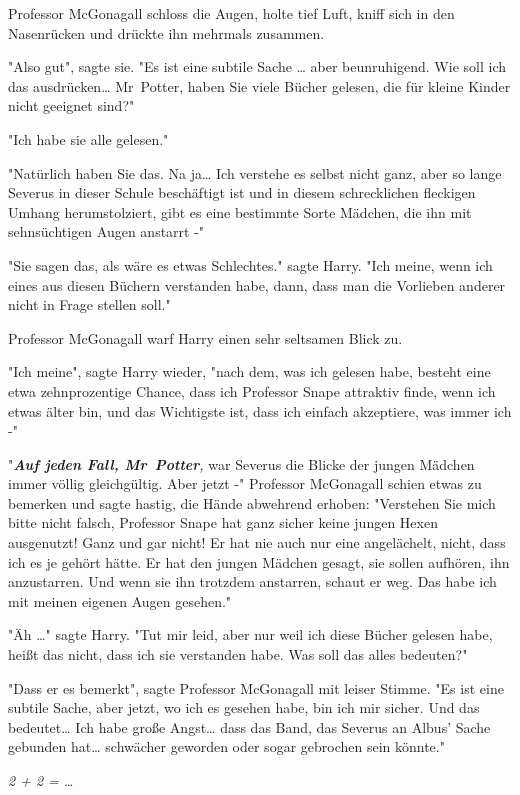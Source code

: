 {Professor McGonagall schloss die Augen, holte tief Luft, kniff sich in den Nasenrücken und drückte ihn mehrmals zusammen.

"Also gut", sagte sie. "Es ist eine subtile Sache … aber beunruhigend. Wie soll ich das ausdrücken… Mr~Potter, haben Sie viele Bücher gelesen, die für kleine Kinder nicht geeignet sind?"

"Ich habe sie alle gelesen."

"Natürlich haben Sie das. Na ja… Ich verstehe es selbst nicht ganz, aber so lange Severus in dieser Schule beschäftigt ist und in diesem schrecklichen fleckigen Umhang herumstolziert, gibt es eine bestimmte Sorte Mädchen, die ihn mit sehnsüchtigen Augen anstarrt -"

"Sie sagen das, als wäre es etwas Schlechtes." sagte Harry. "Ich meine, wenn ich eines aus diesen Büchern verstanden habe, dann, dass man die Vorlieben anderer nicht in Frage stellen soll."

Professor McGonagall warf Harry einen sehr seltsamen Blick zu.

"Ich meine", sagte Harry wieder, "nach dem, was ich gelesen habe, besteht eine etwa zehnprozentige Chance, dass ich Professor Snape attraktiv finde, wenn ich etwas älter bin, und das Wichtigste ist, dass ich einfach akzeptiere, was immer ich -"

"\textbf{\emph{Auf jeden Fall, Mr~Potter}}\emph{,} war Severus die Blicke der jungen Mädchen immer völlig gleichgültig. Aber jetzt -" Professor McGonagall schien etwas zu bemerken und sagte hastig, die Hände abwehrend erhoben: "Verstehen Sie mich bitte nicht falsch, Professor Snape hat ganz sicher keine jungen Hexen ausgenutzt! Ganz und gar nicht! Er hat nie auch nur eine angelächelt, nicht, dass ich es je gehört hätte. Er hat den jungen Mädchen gesagt, sie sollen aufhören, ihn anzustarren. Und wenn sie ihn trotzdem anstarren, schaut er weg. Das habe ich mit meinen eigenen Augen gesehen."

"Äh …" sagte Harry. "Tut mir leid, aber nur weil ich diese Bücher gelesen habe, heißt das nicht, dass ich sie verstanden habe. Was soll das alles bedeuten?"

"Dass er es bemerkt", sagte Professor McGonagall mit leiser Stimme. "Es ist eine subtile Sache, aber jetzt, wo ich es gesehen habe, bin ich mir sicher. Und das bedeutet… Ich habe große Angst… dass das Band, das Severus an Albus' Sache gebunden hat… schwächer geworden oder sogar gebrochen sein könnte."

\emph{2 + 2 = …}

}
